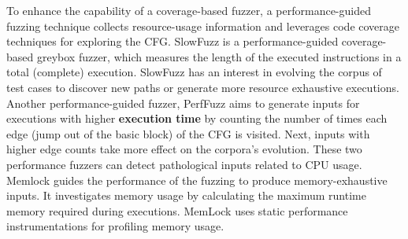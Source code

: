 To enhance the capability of a coverage-based fuzzer, a performance-guided fuzzing technique collects resource-usage information and leverages code coverage techniques for exploring the CFG. SlowFuzz \cite{petsios2017slowfuzz} is a performance-guided coverage-based greybox fuzzer, which measures the length of the executed instructions in a total (complete) execution. SlowFuzz has an interest in evolving the corpus of test cases to discover new paths or generate more resource exhaustive executions. Another performance-guided fuzzer, PerfFuzz \cite{lemieux2018perffuzz} aims to generate inputs for executions with higher \textbf{execution time} by counting the number of times each edge (jump out of the basic block) of the CFG is visited. Next, inputs with higher edge counts take more effect on the corpora's evolution. These two performance fuzzers can detect pathological inputs related to CPU usage. Memlock \cite{wen2020memlock} guides the performance of the fuzzing to produce memory-exhaustive inputs. It investigates memory usage by calculating the maximum runtime memory required during executions. MemLock uses static performance instrumentations for profiling memory usage.

